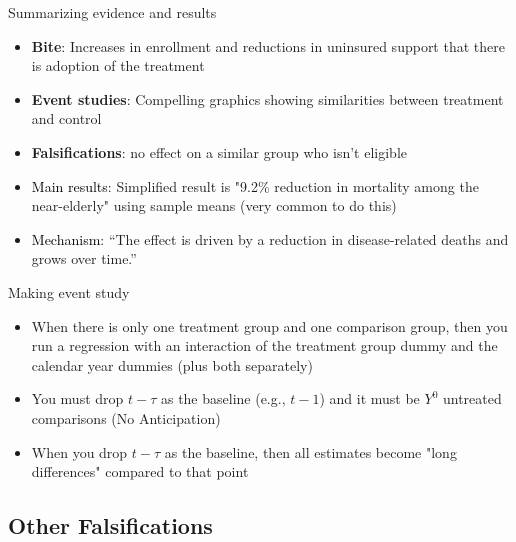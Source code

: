 \documentclass{beamer}
\begin{document}
\begin{frame}{Summarizing evidence and results}

\begin{itemize}
\item \textbf{Bite}: Increases in enrollment and reductions in uninsured support that there is adoption of the treatment
\item \textbf{Event studies}: Compelling graphics showing similarities between treatment and control
\item \textbf{Falsifications}: no effect on a similar group who isn't eligible
\item \textcolor{black}{Main results}: Simplified result is "9.2\% reduction in mortality among the near-elderly" using sample means (very common to do this)
\item \textcolor{black}{Mechanism}: ``The effect is driven by a reduction in disease-related deaths and grows over time.''
\end{itemize}

\end{frame}

\begin{frame}{Making event study}

\begin{itemize}
\item When there is only one treatment group and one comparison group, then you run a regression with an interaction of the treatment group dummy and the calendar year dummies (plus both separately)
\item You must drop $t-\tau$ as the baseline (e.g., $t-1$) and it must be $Y^0$ untreated comparisons (No Anticipation)
\item When you drop $t-\tau$ as the baseline, then all estimates become "long differences" compared to that point
\end{itemize}

\end{frame}




\subsection{Other Falsifications}
\end{document}
